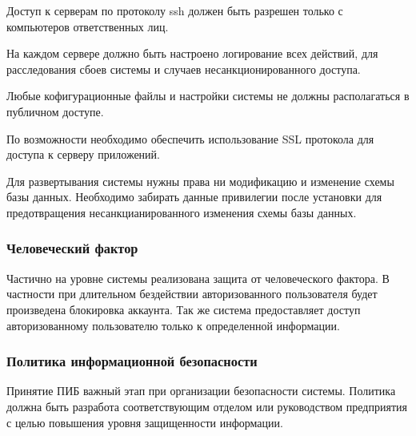 Доступ к серверам по протоколу ssh должен быть разрешен только с компьютеров
ответственных лиц.

На каждом сервере должно быть настроено логирование всех действий, для
расследования сбоев системы и случаев несанкционированного доступа.

Любые кофигурационные файлы и настройки системы не должны располагаться в
публичном доступе.

По возможности необходимо обеспечить использование SSL протокола для доступа к
серверу приложений.

Для развертывания системы нужны права ни модификацию и изменение схемы базы
данных. Необходимо забирать данные привилегии после установки для предотвращения
несанкцианированного изменения схемы базы данных.

\subsubsection{Человеческий фактор}
Частично на уровне системы реализована защита от человеческого фактора. В
частности при длительном бездействии авторизованного пользователя будет
произведена блокировка аккаунта. Так же система предоставляет доступ
авторизованному пользователю только к определенной информации.

\subsubsection{Политика информационной безопасности}
Принятие ПИБ важный этап при организации безопасности системы. Политика должна
быть разработа соответствующим отделом или руководством предприятия с целью
повышения уровня защищенности информации.
